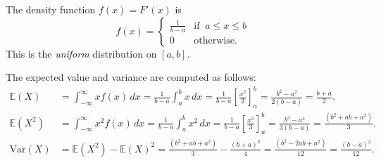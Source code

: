 \documentclass[lecture]{csm}
\newcommand{\expe}{\mathbb{E}}
\newcommand{\var}{\text{Var}}
\begin{document}
\begin{solution}
The density function $f(x) = F'(x)$ is
\[
f(x) = \begin{cases}
	\displaystyle\frac{1}{b-a}	& \text{if }\ a\leq x\leq b \\[0ex]
	0				& \text{otherwise.}
\end{cases}	
\]
This is the \emph{uniform} distribution on $[a,b]$. 

The expected value and variance are computed as follows:
\begin{align*}
\expe(X)
	& = \int_{-\infty}^{\infty}x f(x)\,dx
	= \frac{1}{b-a}\int_{a}^{b}x\,dx
	= \frac{1}{b-a}\left[\frac{x^2}{2}\right] _{a}^{b}
	= \frac{b^2-a^2}{2(b-a)}
	= \frac{b+a}{2}. \\[2ex]
\expe(X^2)
	& = \int_{-\infty}^{\infty} x^2 f(x)\,dx
	= \frac{1}{b-a}\int_{a}^{b} x^2\,dx 
	= \frac{1}{b-a}\left[\frac{x^3}{3}\right]_{a}^{b}
	= \frac{b^{3}-a^{3}}{3(b-a)}
	= \frac{(b^{2}+ab+a^{2})}{3}. \\[2ex]
\var(X)
	& = \expe(X^2) - \expe(X)^2 
	= \frac{(b^{2}+ab+a^{2})}{3} - \frac{(b+a)^{2}}{4} 
	= \frac{(b^{2}-2ab+a^{2})}{12}
	= \frac{(b-a)^{2}}{12}.
\end{align*}
\end{solution}
\end{document}
